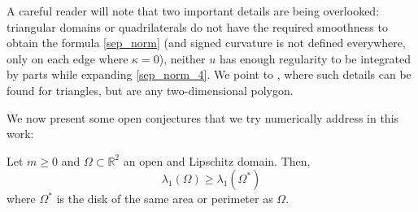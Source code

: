 \begin{remark}
    A careful reader will note that two important details are being overlooked: triangular domains or quadrilaterals do not have the required smoothness to obtain the formula \eqref{sep_norm} (and signed curvature is not defined everywhere, only on each edge where \(\kappa=0\)), neither \(u\) has enough regularity to be integrated by parts while expanding \eqref{sep_norm_4}. We point to \cite{vu2023spectral}, where such details can be found for triangles, but are any two-dimensional polygon.
\end{remark}

We now present some open conjectures that we try numerically address in this work:

\begin{conjecture}
    Let \(m \geq 0\) and \(\Omega \subset \mathbb{R}^2\) an open and Lipschitz domain. Then,
    \[
    \lambda_1(\Omega) \geq \lambda_1(\Omega^\ast)
    \]
    where \(\Omega^\ast\) is the disk of the same area or perimeter as \(\Omega\).
\end{conjecture}

